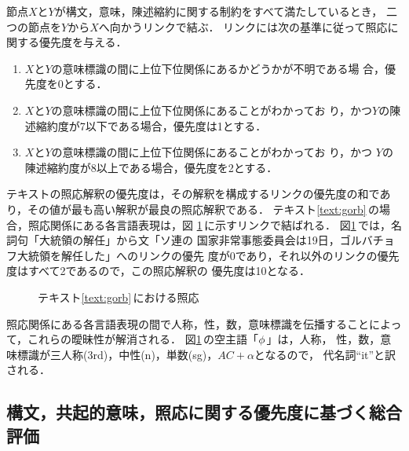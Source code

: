節点$X$と$Y$が構文，意味，陳述縮約に関する制約をすべて満たしているとき，
二つの節点を$Y$から$X$へ向かうリンクで結ぶ．
リンクには次の基準に従って照応に関する優先度を与える．
\begin{enumerate}
\item $X$と$Y$の意味標識の間に上位下位関係にあるかどうかが不明である場
合，優先度を0とする．
\item $X$と$Y$の意味標識の間に上位下位関係にあることがわかってお
り，かつ$Y$の陳述縮約度が7以下である場合，優先度は1とする．
\item $X$と$Y$の意味標識の間に上位下位関係にあることがわかってお
り，かつ
$Y$の陳述縮約度が8以上である場合，優先度を2とする．
\end{enumerate}

テキストの照応解釈の優先度は，その解釈を構成するリンクの優先度の和であ
り，その値が最も高い解釈が最良の照応解釈である．
テキスト\ref{text:gorb}\,の場合，照応関係にある各言語表現は，図
\ref{fig:gorb}\,に示すリンクで結ばれる．
図\ref{fig:gorb}\,では，名詞句「大統領の解任」から文「ソ連の
国家非常事態委員会は19日，ゴルバチョフ大統領を解任した」へのリンクの優先
度が0であり，それ以外のリンクの優先度はすべて2であるので，この照応解釈の
優先度は10となる．
\begin{figure}[tbhp]
\begin{center}
    \begin{epsf}
    \end{epsf}
    \begin{draft}
    \end{draft}
\end{center}
\caption{テキスト\protect\ref{text:gorb}\,における照応}
\label{fig:gorb}
\end{figure}

照応関係にある各言語表現の間で人称，性，数，意味標識を伝播することによっ
て，これらの曖昧性が解消される．
図\ref{fig:gorb}\,の空主語「$\phi_{}$」は，人称，
性，数，意味標識が三人称(3rd)，中性(n)，単数(sg)，$AC+\alpha$となるので，
代名詞``it''と訳される．

\subsection{構文，共起的意味，照応に関する優先度に基づく総合評価}
\label{sec:analysis:integ:balance}


